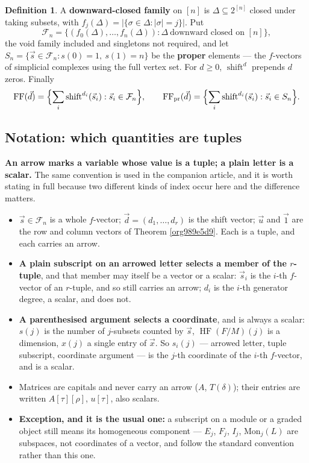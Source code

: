 \documentclass[11pt, a4paper, abstract=yes]{scrartcl}
\theoremstyle{definition}
\newtheorem{definition}{Definition}
\theoremstyle{remark}
\theoremstyle{plain}
\newcommand{\vek}[1]{\boldsymbol{#1}}
\newcommand{\shift}{\operatorname{shift}}
\newcommand{\HF}{\operatorname{HF}}
\renewcommand{\vek}[1]{\vec{#1}}
\begin{document}
\begin{definition}
A \textbf{downward-closed family} on \([n]\) is \(\Delta\subseteq2^{[n]}\) closed under taking subsets, with
\(f_j(\Delta)=|\lbrace\sigma\in\Delta:|\sigma|=j\rbrace|\). Put
\[
  \mathcal F_n=\lbrace(f_0(\Delta),\dots,f_n(\Delta)):\Delta\ \text{downward closed on }[n]\rbrace,
\]
the void family included and singletons not required, and let
\(S_n=\lbrace \vek s\in\mathcal F_n:s(0)=1,\ s(1)=n\rbrace\) be the \textbf{proper} elements --- the \(f\)-vectors
of simplicial complexes using the full vertex set. For \(d\ge0\), \(\shift^d\) prepends \(d\) zeros.
Finally
\[
  \mathrm{FF}(\vek d)=\Bigl\lbrace\sum_i\shift^{d_i}(\vek s_i):\vek s_i\in\mathcal F_n\Bigr\rbrace,\qquad
  \mathrm{FF}_{\mathrm{pr}}(\vek d)=\Bigl\lbrace\sum_i\shift^{d_i}(\vek s_i):\vek s_i\in S_n\Bigr\rbrace .
\]
\label{orgb41e97d}
\end{definition}
\subsection{Notation: which quantities are tuples}
\label{sec:org8692471}

\textbf{An arrow marks a variable whose value is a tuple; a plain letter is a scalar.} The same convention
is used in the companion article, and it is worth stating in full because two different kinds of
index occur here and the difference matters.

\begin{itemize}
\item \(\vek s\in\mathcal F_n\) is a whole \(f\)-vector; \(\vek d=(d_1,\dots,d_r)\) is the shift vector;
\(\vek u\) and \(\vek 1\) are the row and column vectors of Theorem \ref{org989e5d9}. Each is a tuple, and
each carries an arrow.
\item \textbf{A plain subscript on an arrowed letter selects a member of the \(r\)-tuple}, and that member may
itself be a vector or a scalar: \(\vek s_i\) is the \(i\)-th \(f\)-vector of an \(r\)-tuple, and so
still carries an arrow; \(d_i\) is the \(i\)-th generator degree, a scalar, and does not.
\item \textbf{A parenthesised argument selects a coordinate}, and is always a scalar: \(s(j)\) is the number of
\(j\)-subsets counted by \(\vek s\), \(\HF(F/M)(j)\) is a dimension, \(x(j)\) a single entry of
\(\vek x\). So \(s_i(j)\) --- arrowed letter, tuple subscript, coordinate argument --- is the
\(j\)-th coordinate of the \(i\)-th \(f\)-vector, and is a scalar.
\item Matrices are capitals and never carry an arrow (\(A\), \(T(\delta)\)); their entries are written
\(A[\tau][\rho]\), \(u[\tau]\), also scalars.
\item \textbf{Exception, and it is the usual one:} a subscript on a module or a graded object still means its
homogeneous component --- \(E_j\), \(F_j\), \(I_j\), \(\mathrm{Mon}_j(L)\) are subspaces, not
coordinates of a vector, and follow the standard convention rather than this one.
\end{itemize}
\end{document}
